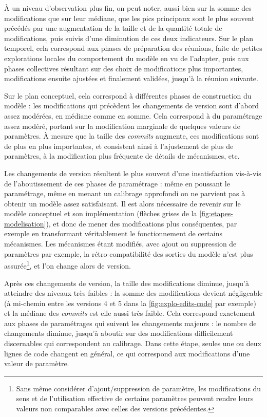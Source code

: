 À un niveau d'observation plus fin, on peut noter, aussi bien sur la somme des modifications que sur leur médiane, que les pics principaux sont le plus souvent précédés par une augmentation de la taille et de la quantité totale de modifications, puis suivis d'une diminution de ces deux indicateurs.
Sur le plan \og temporel\fg{}, cela correspond aux phases de préparation des réunions, faite de petites explorations locales du comportement du modèle en vu de l'adapter, puis aux phases collectives résultant sur des choix de modifications plus importantes, modifications ensuite ajustées et finalement validées, jusqu'à la réunion suivante.

Sur le plan conceptuel, cela correspond à différentes phases de construction du modèle : les modifications qui précèdent les changements de version sont d'abord assez modérées, en médiane comme en somme.
Cela correspond à du paramétrage assez modéré, portant sur la modification marginale de quelques valeurs de paramètres.
À mesure que la taille des \textit{commits} augmente, ces modifications sont de plus en plus importantes, et consistent ainsi à l'ajustement de plus de paramètres, à la modification plus fréquente de détails de mécanismes, etc.

Les changements de version résultent le plus souvent d'une insatisfaction vis-à-vis de l'aboutissement de ces phases de paramétrage : même en poussant le paramétrage, même en menant un calibrage approfondi on ne parvient pas à obtenir un modèle assez satisfaisant.
Il est alors nécessaire de revenir sur le modèle conceptuel et son implémentation (flèches grises de la \cref{fig:etapes-modelisation}), et donc de mener des modifications plus conséquentes, par exemple en transformant véritablement le fonctionnement de certains mécanismes.
Les mécanismes étant modifiés, avec ajout ou suppression de paramètres par exemple, la rétro-compatibilité des sorties du modèle n'est plus assurée\footnote{
	Sans même considérer d'ajout/suppression de paramètre, les modifications du sens et de l'utilisation effective de certains paramètres peuvent rendre leurs valeurs non comparables avec celles des versions précédentes.
}, et l'on change alors de version.

Après ces changements de version, la taille des modifications diminue, jusqu'à atteindre des niveaux très faibles : la somme des modifications devient négligeable (à mi-chemin entre les versions 4 et 5 dans la \cref{fig:explo-edits-code} par exemple)  et la médiane des \textit{commits} est elle aussi très faible.
Cela correspond exactement aux phases de paramétrages qui suivent les changements majeurs : le nombre de changements diminue, jusqu'à aboutir sur des modifications difficilement discernables qui correspondent au calibrage.
Dans cette étape, seules une ou deux lignes de code changent en général, ce qui correspond aux modifications d'une valeur de paramètre.

